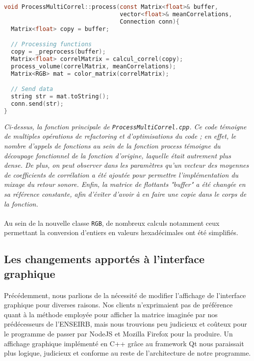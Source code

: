\begin{lstlisting}[language=C, frame=single, breaklines=true]
void ProcessMultiCorrel::process(const Matrix<float>& buffer,
                                 vector<float>& meanCorrelations,
                                 Connection conn){
  Matrix<float> copy = buffer;

  // Processing functions
  copy = _preprocess(buffer);
  Matrix<float> correlMatrix = calcul_correl(copy);
  process_volume(correlMatrix, meanCorrelations);
  Matrix<RGB> mat = color_matrix(correlMatrix);

  // Send data
  string str = mat.toString();
  conn.send(str);
}
\end{lstlisting}
\begin{center}
 \textit{Ci-dessus, la fonction principale de
  \verb!ProcessMultiCorrel.cpp!. Ce code témoigne de multiples
  opérations de refactoring et d'optimisations du code ; en effet,
  le nombre d'appels de fonctions au sein de la fonction process témoigne du
  découpage fonctionnel de la fonction d'origine, laquelle était autrement
  plus dense. De plus, on peut observer dans les paramètres qu'un
  vecteur des moyennes de coefficients de corrélation a été ajoutée
  pour permettre l'implémentation du mixage du retour sonore. Enfin,
  la matrice de flottants "buffer" a été changée en sa référence
  constante, afin d'éviter d'avoir à en faire une copie dans le
 corps de la fonction.}
\end{center}

\paragraph{}
Au sein de la nouvelle classe \verb!RGB!, de nombreux calculs notamment ceux permettant la conversion d'entiers en valeurs hexadécimales ont été simplifiés.

\subsection{Les changements apportés à l'interface graphique}
\paragraph{}
Précédemment, nous parlions de la nécessité de modifier l'affichage de
l'interface graphique pour diverses raisons. Nos clients n'exprimaient
pas de préférence quant à la méthode employée pour afficher la matrice
imaginée par nos prédécesseurs de l'ENSEIRB, mais nous trouvions peu
judicieux et coûteux pour le programme de passer par NodeJS et Mozilla
Firefox pour la produire. Un affichage graphique implémenté en C++
grâce au framework Qt nous paraissait plus logique, judicieux et
conforme au reste de l'architecture de notre programme.

